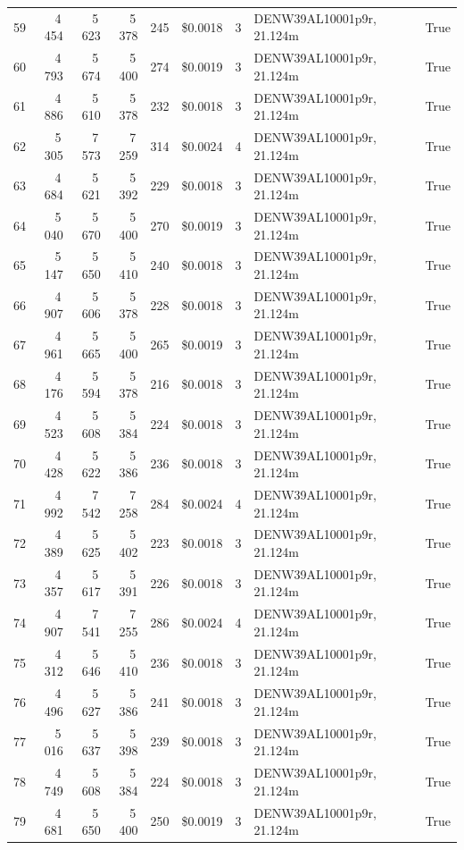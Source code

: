 \documentclass[a4paper,11pt]{article}
\begin{document}
\begin{table}[ht]
\begin{tabular}{r r r r r r r p{3cm} l}
59 & 4\,454 & 5\,623 & 5\,378 & 245 & \$0.0018 & 3 & DENW39AL10001p9r, 21.124m & True \\
60 & 4\,793 & 5\,674 & 5\,400 & 274 & \$0.0019 & 3 & DENW39AL10001p9r, 21.124m & True \\
61 & 4\,886 & 5\,610 & 5\,378 & 232 & \$0.0018 & 3 & DENW39AL10001p9r, 21.124m & True \\
62 & 5\,305 & 7\,573 & 7\,259 & 314 & \$0.0024 & 4 & DENW39AL10001p9r, 21.124m & True \\
63 & 4\,684 & 5\,621 & 5\,392 & 229 & \$0.0018 & 3 & DENW39AL10001p9r, 21.124m & True \\
64 & 5\,040 & 5\,670 & 5\,400 & 270 & \$0.0019 & 3 & DENW39AL10001p9r, 21.124m & True \\
65 & 5\,147 & 5\,650 & 5\,410 & 240 & \$0.0018 & 3 & DENW39AL10001p9r, 21.124m & True \\
66 & 4\,907 & 5\,606 & 5\,378 & 228 & \$0.0018 & 3 & DENW39AL10001p9r, 21.124m & True \\
67 & 4\,961 & 5\,665 & 5\,400 & 265 & \$0.0019 & 3 & DENW39AL10001p9r, 21.124m & True \\
68 & 4\,176 & 5\,594 & 5\,378 & 216 & \$0.0018 & 3 & DENW39AL10001p9r, 21.124m & True \\
69 & 4\,523 & 5\,608 & 5\,384 & 224 & \$0.0018 & 3 & DENW39AL10001p9r, 21.124m & True \\
70 & 4\,428 & 5\,622 & 5\,386 & 236 & \$0.0018 & 3 & DENW39AL10001p9r, 21.124m & True \\
71 & 4\,992 & 7\,542 & 7\,258 & 284 & \$0.0024 & 4 & DENW39AL10001p9r, 21.124m & True \\
72 & 4\,389 & 5\,625 & 5\,402 & 223 & \$0.0018 & 3 & DENW39AL10001p9r, 21.124m & True \\
73 & 4\,357 & 5\,617 & 5\,391 & 226 & \$0.0018 & 3 & DENW39AL10001p9r, 21.124m & True \\
74 & 4\,907 & 7\,541 & 7\,255 & 286 & \$0.0024 & 4 & DENW39AL10001p9r, 21.124m & True \\
75 & 4\,312 & 5\,646 & 5\,410 & 236 & \$0.0018 & 3 & DENW39AL10001p9r, 21.124m & True \\
76 & 4\,496 & 5\,627 & 5\,386 & 241 & \$0.0018 & 3 & DENW39AL10001p9r, 21.124m & True \\
77 & 5\,016 & 5\,637 & 5\,398 & 239 & \$0.0018 & 3 & DENW39AL10001p9r, 21.124m & True \\
78 & 4\,749 & 5\,608 & 5\,384 & 224 & \$0.0018 & 3 & DENW39AL10001p9r, 21.124m & True \\
79 & 4\,681 & 5\,650 & 5\,400 & 250 & \$0.0019 & 3 & DENW39AL10001p9r, 21.124m & True \\

\end{tabular}
\end{table}
\end{document}
